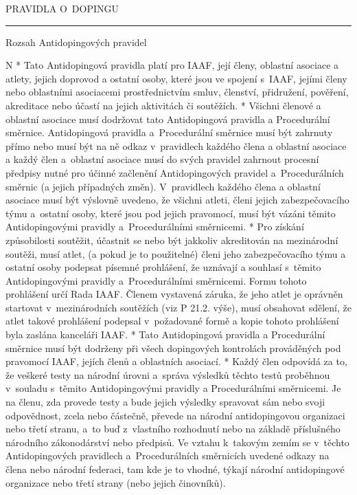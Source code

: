 \sec PRAVIDLA O~DOPINGU

\rule{29}
\secc Rozsah Antidopingových pravidel

\begitems \style N
* Tato Antidopingová pravidla platí pro IAAF, její členy, oblastní asociace a atlety, jejich doprovod a ostatní osoby, které jsou ve spojení s~IAAF, jejími členy nebo oblastními asociacemi prostřednictvím smluv, členství, přidružení, pověření, akreditace nebo účastí na jejich aktivitách či soutěžích.
* Všichni členové a oblastní asociace musí dodržovat tato Antidopingová pravidla a Procedurální směrnice. Antidopingová pravidla a~Procedurální směrnice musí být zahrnuty přímo nebo musí být na ně odkaz v~pravidlech každého člena a oblastní asociace a každý člen a~oblastní asociace musí do svých pravidel zahrnout procesní předpisy nutné pro účinné začlenění Antidopingových pravidel a~Procedurálních směrnic (a jejich případných změn). V~pravidlech každého člena a oblastní asociace musí být výslovně uvedeno, že všichni atleti, členi jejich zabezpečovacího týmu a~ostatní osoby, které jsou pod jejich pravomocí, musí být vázáni těmito Antidopingovými pravidly a~Procedurálními směrnicemi.
* Pro získání způsobilosti soutěžit, účastnit se nebo být jakkoliv akreditován na mezinárodní soutěži, musí atlet, (a pokud je to použitelné) členi jeho zabezpečovacího týmu a ostatní osoby podepsat písemné prohlášení, že uznávají a souhlasí s~těmito Antidopingovými pravidly a~Procedurálními směrnicemi. Formu tohoto prohlášení určí Rada IAAF. Členem vystavená záruka, že jeho atlet je oprávněn startovat v~mezinárodních soutěžích (viz P 21.2. výše), musí obsahovat sdělení, že atlet takové prohlášení podepsal v~požadované formě a kopie tohoto prohlášení byla zaslána kanceláři IAAF.
* Tato Antidopingová pravidla a Procedurální směrnice musí být dodrženy při všech dopingových kontrolách prováděných pod pravomocí IAAF, jejích členů a oblastních asociací.
* Každý člen odpovídá za to, že veškeré testy na národní úrovni a~správa výsledků těchto testů proběhnou v~souladu s~těmito Antidopingovými pravidly a Procedurálními směrnicemi. Je na členu, zda provede testy a bude jejich výsledky spravovat sám nebo svoji odpovědnost, zcela nebo částečně, převede na národní antidopingovou organizaci nebo třetí stranu, a~to buď z~vlastního rozhodnutí nebo na základě příslušného národního zákonodárství nebo předpisů. Ve vztahu k~takovým zemím se v~těchto Antidopingových pravidlech a~Procedurálních směrnicích uvedené odkazy na člena nebo národní federaci, tam kde je to vhodné, týkají národní antidopingové organizace nebo třetí strany (nebo jejich činovníků).
